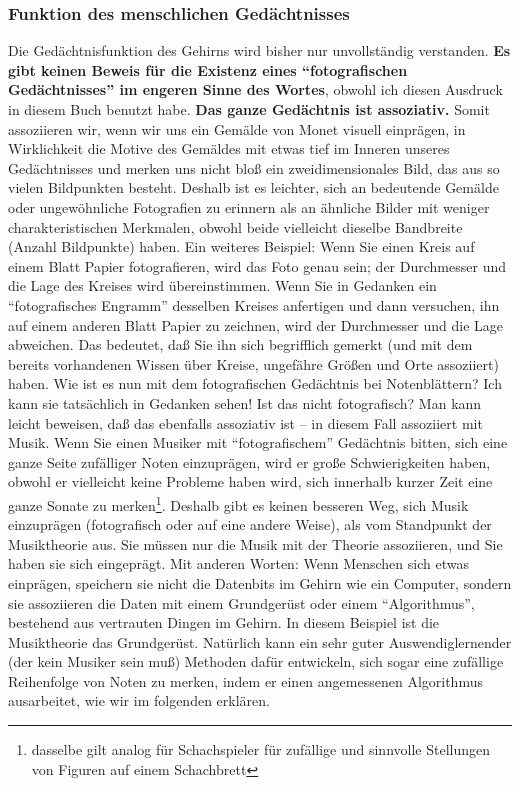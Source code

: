 
\subsubsection{Funktion des menschlichen Gedächtnisses}
\label{c1iii6m}

Die Gedächtnisfunktion des Gehirns wird bisher nur unvollständig verstanden.
\textbf{Es gibt keinen Beweis für die Existenz eines \enquote{fotografischen Gedächtnisses} im engeren Sinne des Wortes}, obwohl ich diesen Ausdruck in diesem Buch benutzt habe.
\textbf{Das ganze Gedächtnis ist assoziativ.}
Somit assoziieren wir, wenn wir uns ein Gemälde von Monet visuell einprägen, in Wirklichkeit die Motive des Gemäldes mit etwas tief im Inneren unseres Gedächtnisses und merken uns nicht bloß ein zweidimensionales Bild, das aus so vielen Bildpunkten besteht.
Deshalb ist es leichter, sich an bedeutende Gemälde oder ungewöhnliche Fotografien zu erinnern als an ähnliche Bilder mit weniger charakteristischen Merkmalen, obwohl beide vielleicht dieselbe Bandbreite (Anzahl Bildpunkte) haben.
Ein weiteres Beispiel: Wenn Sie einen Kreis auf einem Blatt Papier fotografieren, wird das Foto genau sein; der Durchmesser und die Lage des Kreises wird übereinstimmen.
Wenn Sie in Gedanken ein \enquote{fotografisches Engramm} desselben Kreises anfertigen und dann versuchen, ihn auf einem anderen Blatt Papier zu zeichnen, wird der Durchmesser und die Lage abweichen.
Das bedeutet, daß Sie ihn sich begrifflich gemerkt (und mit dem bereits vorhandenen Wissen über Kreise, ungefähre Größen und Orte assoziiert) haben.
Wie ist es nun mit dem fotografischen Gedächtnis bei Notenblättern?
Ich kann sie tatsächlich in Gedanken sehen!
Ist das nicht fotografisch?
Man kann leicht beweisen, daß das ebenfalls assoziativ ist -- in diesem Fall assoziiert mit Musik.
Wenn Sie einen Musiker mit \enquote{fotografischem} Gedächtnis bitten, sich eine ganze Seite zufälliger Noten einzuprägen, wird er große Schwierigkeiten haben, obwohl er vielleicht keine Probleme haben wird, sich innerhalb kurzer Zeit eine ganze Sonate zu merken\footnote{dasselbe gilt analog für Schachspieler für zufällige und sinnvolle Stellungen von Figuren auf einem Schachbrett}.
Deshalb gibt es keinen besseren Weg, sich Musik einzuprägen (fotografisch oder auf eine andere Weise), als vom Standpunkt der Musiktheorie aus.
Sie müssen nur die Musik mit der Theorie assoziieren, und Sie haben sie sich eingeprägt.
Mit anderen Worten: Wenn Menschen sich etwas einprägen, speichern sie nicht die Datenbits im Gehirn wie ein Computer, sondern sie assoziieren die Daten mit einem Grundgerüst oder einem \enquote{Algorithmus}, bestehend aus vertrauten Dingen im Gehirn.
In diesem Beispiel ist die Musiktheorie das Grundgerüst.
Natürlich kann ein sehr guter Auswendiglernender (der kein Musiker sein muß) Methoden dafür entwickeln, sich sogar eine zufällige Reihenfolge von Noten zu merken, indem er einen angemessenen Algorithmus ausarbeitet, wie wir im folgenden erklären.


